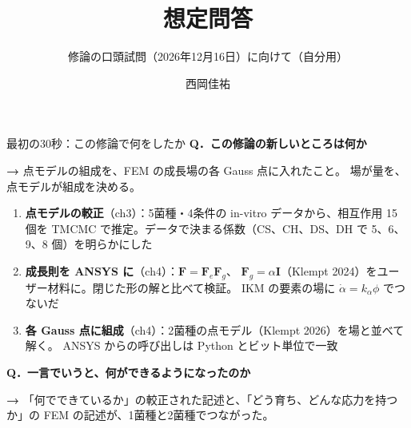 \documentclass[aspectratio=169,11pt]{beamer}
\title{想定問答}
\subtitle{修論の口頭試問（2026年12月16日）に向けて（自分用）}
\author[西岡佳祐]{西岡佳祐}
\date{}
\newcommand{\Q}[1]{\textbf{Q．#1}}
\newcommand{\A}[1]{\vspace{2pt}\colorbox{c3!10}{\parbox{0.95\linewidth}{%
  \small\textbf{→ }#1}}\vspace{3pt}}
\begin{document}
\maketitle

\begin{frame}{最初の30秒：この修論で何をしたか}
\small\Q{この修論の新しいところは何か}
\A{点モデルの組成を、FEM の成長場の各 Gauss 点に入れたこと。
場が量を、点モデルが組成を決める。}
\begin{enumerate}\footnotesize
  \item \textbf{点モデルの較正}（ch3）：5菌種・4条件の in-vitro データから、相互作用 15 個を
        TMCMC で推定。データで決まる係数（CS、CH、DS、DH で 5、6、9、8 個）を明らかにした
  \item \textbf{成長則を ANSYS に}（ch4）：$\mathbf F=\mathbf F_e\mathbf F_g$、
        $\mathbf F_g=\alpha\mathbf I$（Klempt 2024）をユーザー材料に。閉じた形の解と比べて検証。
        IKM の要素の場に $\dot\alpha=k_\alpha\phi$ でつないだ
  \item \textbf{各 Gauss 点に組成}（ch4）：2菌種の点モデル（Klempt 2026）を場と並べて解く。
        ANSYS からの呼び出しは Python とビット単位で一致
\end{enumerate}
\vspace{4pt}
\small\Q{一言でいうと、何ができるようになったのか}
\A{「何でできているか」の較正された記述と、「どう育ち、どんな応力を持つか」の
FEM の記述が、1菌種と2菌種でつながった。}
\end{frame}
\end{document}
